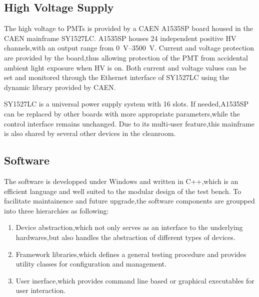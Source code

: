 \documentclass[preprint,5p,times]{elsarticle}
\begin{document}
\subsection{High Voltage Supply}
\label{sec:hv}

The high voltage to PMTs is provided by a CAEN A1535SP board housed in the CAEN mainframe SY1527LC. 
A1535SP houses 24 independent positive HV channels,with an output range from \SIrange{0}{3500}{\volt}.
Current and voltage protection are provided by the board,thus allowing protection of the PMT from accidental ambient light exposure when HV is on.
Both current and voltage values can be set and monitored through the Ethernet interface of SY1527LC using the dynamic library provided by CAEN.

SY1527LC is a universal power supply system with 16 slots.
If needed,A1535SP can be replaced by other boards with more appropriate parameters,while the control interface remains unchanged.
Due to its multi-user feature,this mainframe is also shared by several other devices in the cleanroom.

\subsection{Software}
\label{sec:software}
The software is developped under Windows and written in C++,which is an efficient language and well suited to the modular design of the test bench.
To facilitate maintainence and future upgrade,the software components are groupped into three hierarchies as following:
\begin{enumerate}
 \item Device abstraction,which not only serves as an interface to the underlying hardwares,but also handles the abstraction of different types of devices. 
 \item Framework libraries,which defines a general testing procedure and provides utility classes for configuration and management.
 \item User inerface,which provides command line based or graphical executables for user interaction. 
\end{enumerate}
\end{document}
